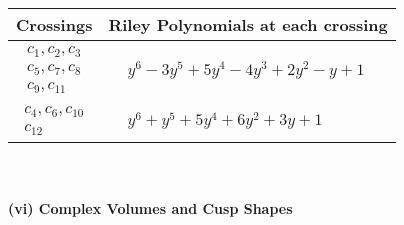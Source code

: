 \documentclass[1p]{elsarticle_modified}
\theoremstyle{definition}
\begin{document}
\begin{tabular}{m{50pt}|m{274pt}}
Crossings & \hspace{64pt}Riley Polynomials at each crossing \\
\hline $$\begin{aligned}c_{1},c_{2},c_{3}\\c_{5},c_{7},c_{8}\\c_{9},c_{11}\end{aligned}$$&$\begin{aligned}
&y^6-3 y^5+5 y^4-4 y^3+2 y^2- y+1
\end{aligned}$\\
\hline $$\begin{aligned}c_{4},c_{6},c_{10}\\c_{12}\end{aligned}$$&$\begin{aligned}
&y^6+y^5+5 y^4+6 y^2+3 y+1
\end{aligned}$\\
\hline
\end{tabular}\\~\\
\newpage\flushleft \textbf{(vi) Complex Volumes and Cusp Shapes}
\end{document}

